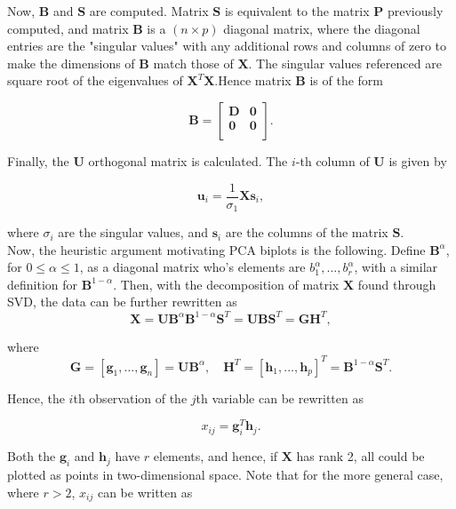 \documentclass{article}\usepackage[]{graphicx}\usepackage[]{xcolor}
\numberwithin{equation}{section}
\begin{document}
{\noindent Now, $\mathbf{B}$ and $\mathbf{S}$ are computed. Matrix $\mathbf{S}$ is equivalent to the matrix $\mathbf{P}$ previously computed, and matrix $\mathbf{B}$ is a $(n \times p)$ diagonal matrix, where the diagonal entries are the "singular values" with any additional rows and columns of zero to make the dimensions of $\mathbf{B}$ match those of $\mathbf{X}$. The singular values referenced are square root of the eigenvalues of $\mathbf{X}^T\mathbf{X}$.Hence matrix $\mathbf{B}$ is of the form

\[
\mathbf{B} = 
\begin{bmatrix}
    \mathbf{D} & \mathbf{0} \\
    \mathbf{0} & \mathbf{0} \\
\end{bmatrix}.
\]

\noindent Finally, the $\mathbf{U}$ orthogonal matrix is calculated. The $i$-th column of $\mathbf{U}$ is given by

\[
\mathbf{u}_i = \frac{1}{\sigma_1}\mathbf{X}\mathbf{s}_i,
\]

\noindent where $\sigma_i$ are the singular values, and $\mathbf{s}_i$ are the columns of the matrix $\mathbf{S}$.\\



\noindent Now, the heuristic argument motivating PCA biplots is the following. Define $\mathbf{B}^{\alpha}$, for $0 \leq \alpha \leq 1$, as a diagonal matrix who's elements are $b_1^{\alpha}, \ldots, b_r^{\alpha}$, with a similar definition for $\mathbf{B}^{1-\alpha}.$ Then, with the decomposition of matrix $\mathbf{X}$ found through SVD, the data can be further rewritten as
\[\mathbf{X} = \mathbf{U}\mathbf{B}^{\alpha}\mathbf{B}^{1-\alpha}\mathbf{S}^{T} = \mathbf{U}\mathbf{B}\mathbf{S}^{T} = \mathbf{G}\mathbf{H}^{T},\]

\noindent where \[\mathbf{G} = [\mathbf{g}_1, \dots , \mathbf{g}_n] = \mathbf{U}\mathbf{B}^\alpha, \quad \mathbf{H}^T = [\mathbf{h}_1, \dots , \mathbf{h}_p]^T = \mathbf{B}^{1-\alpha}\mathbf{S}^T. \]

\noindent Hence, the $i$th observation of the $j$th variable can be rewritten as

\[ x_{ij} = \mathbf{g}_i^T \mathbf{h}_j. \]

\noindent Both the $\mathbf{g}_i$ and $\mathbf{h}_j$ have $r$ elements, and hence, if $\mathbf{X}$ has rank 2, all could be plotted as points in two-dimensional space. Note that for the more general case, where $r > 2$, $x_{ij}$ can be written as

}
\end{document}

